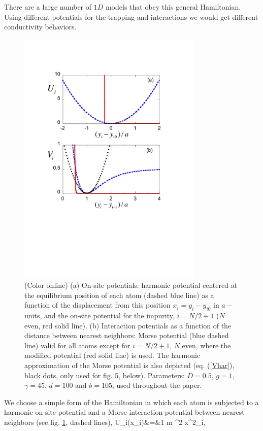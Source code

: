 There are a large number of $1D$ models that obey this general Hamiltonian. Using different potentials for the trapping and interactions we would get different conductivity behaviors.
\begin{figure}
\centering
\includegraphics[width=8.8cm]{Figures/FIG1.pdf}
\caption{(Color online) (a) On-site potentials: harmonic potential centered at the equilibrium position of each atom (dashed blue line) as a function of the displacement from this position $x_i=y_i-y_{i0}$ in $a-$units, and the on-site potential for the impurity, $i=N/2+1$
($N$ even, red solid line). (b) Interaction potentials as a function of the distance between nearest neighbors: Morse potential
(blue dashed line) valid for all atoms except for $i=N/2+1$, $N$ even, where the modified potential (red solid line) is used.
The harmonic approximation of the Morse potential is also depicted (eq. (\ref{Vhar}), black dots, only used for fig. 5, below).
Parameters: $D=0.5$, $g=1$, $\gamma = 45$, $d=100$ and $b=105$, used throughout the paper.
}
\label{figure1}
\end{figure}
%
We choose a simple form of the Hamiltonian in
which each atom is subjected to a harmonic on-site potential and a Morse interaction potential between nearest neighbors (see fig. \ref{figure1}, dashed lines),
%
\beqa
\label{HO}
U_i(x_i)&=&{1 } m \omega^2 x^2_i,
